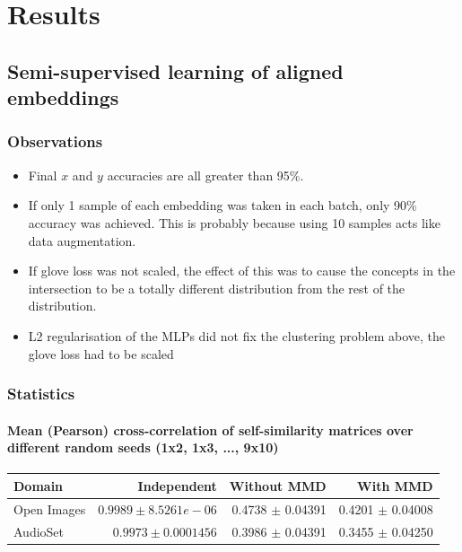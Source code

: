 \chapter{Results}


\section{Semi-supervised learning of aligned embeddings}

\subsection{Observations}

\begin{itemize}
    \item Final $x$ and $y$ accuracies are all greater than 95\%.
    \item If only 1 sample of each embedding was taken in each batch, only 90\% accuracy was achieved. This is probably because using 10 samples acts like data augmentation. 
    \item If glove loss was not scaled, the effect of this was to cause the concepts in the intersection to be a totally different distribution from the rest of the distribution.
    \item L2 regularisation of the MLPs did not fix the clustering problem above, the glove loss had to be scaled
\end{itemize}

\subsection{Statistics}

\subsubsection{Mean (Pearson) cross-correlation of self-similarity matrices over different random seeds (1x2, 1x3, ..., 9x10)}
\begin{tabular}{lrrr}
\toprule
Domain &   Independent & Without MMD &  With MMD \\
\midrule
Open Images    &  $0.9989 \pm 8.5261e-06$  & 0.4738 $\pm$ 0.04391 &     0.4201 $\pm$  0.04008 \\
AudioSet    & $0.9973 \pm 0.0001456$ &  0.3986 $\pm$ 0.04391  &      0.3455  $\pm$ 0.04250  \\
\bottomrule
\end{tabular}\\

